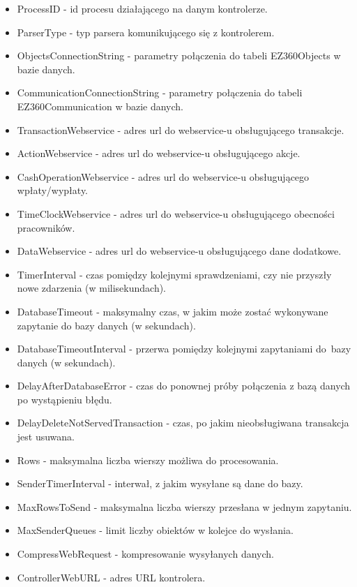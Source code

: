 \documentclass[a4paper]{book}
\begin{document}
\begin{itemize}
	\setlength\itemsep{0.1pt}
	\item ProcessID - id procesu działającego na danym kontrolerze.
	\item ParserType - typ parsera komunikującego się z kontrolerem.
	\item ObjectsConnectionString - parametry połączenia do tabeli EZ360Objects w bazie danych.
	\item CommunicationConnectionString - parametry połączenia do tabeli \newline EZ360Communication w bazie danych.
	\item TransactionWebservice - adres url do webservice-u obsługującego transakcje.
	\item ActionWebservice - adres url do webservice-u obsługującego akcje.
	\item CashOperationWebservice - adres url do webservice-u obsługującego wpłaty/wypłaty.
	\item TimeClockWebservice - adres url do webservice-u obsługującego obecności pracowników.
	\item DataWebservice - adres url do webservice-u obsługującego dane dodatkowe.
	\item TimerInterval - czas pomiędzy kolejnymi sprawdzeniami, czy nie przyszły nowe zdarzenia (w milisekundach).
	\item DatabaseTimeout - maksymalny czas, w jakim może zostać wykonywane zapytanie do bazy danych (w sekundach).
	\item DatabaseTimeoutInterval - przerwa pomiędzy kolejnymi zapytaniami do~bazy danych (w sekundach).
	\item DelayAfterDatabaseError - czas do ponownej próby połączenia z bazą danych po wystąpieniu błędu.
	\item DelayDeleteNotServedTransaction - czas, po jakim nieobsługiwana transakcja jest usuwana.
	\item Rows - maksymalna liczba wierszy możliwa do procesowania.
	\item SenderTimerInterval - interwał, z jakim wysyłane są dane do bazy.
	\item MaxRowsToSend - maksymalna liczba wierszy przesłana w jednym zapytaniu.
	\item MaxSenderQueues - limit liczby obiektów w kolejce do wysłania.
	\item CompressWebRequest - kompresowanie wysyłanych danych.
	\item ControllerWebURL - adres URL kontrolera.
\end{itemize}
\end{document}
